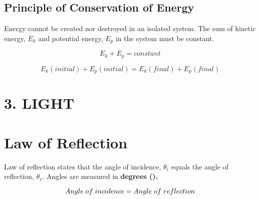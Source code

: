 \documentclass{report}
\begin{document}
\begin{flushleft}
\section*{Principle of Conservation of Energy}
\normalfont Energy cannot be created nor destroyed in an isolated system. The sum of kinetic energy, $E_k$ and potential energy, $E_p$ in the system must be constant.

\begin{equation}
E_k + E_p = constant
\end{equation}

\begin{equation}
E_k (initial) + E_p (initial) = E_k (final) + E_p (final)
\end{equation}

\end{flushleft}

\newpage

\section*{3. LIGHT}

\section*{Law of Reflection}
Law of reflection states that the angle of incidence, $\theta_i$ equals the angle of reflection, $\theta_r$. Angles are measured in \bf{degrees (\degree)}. 

\begin{equation}
Angle \hspace{1mm} of \hspace{1mm} incidence = Angle \hspace{1mm} of \hspace{1mm} reflection
\end{equation}

\end{document}
